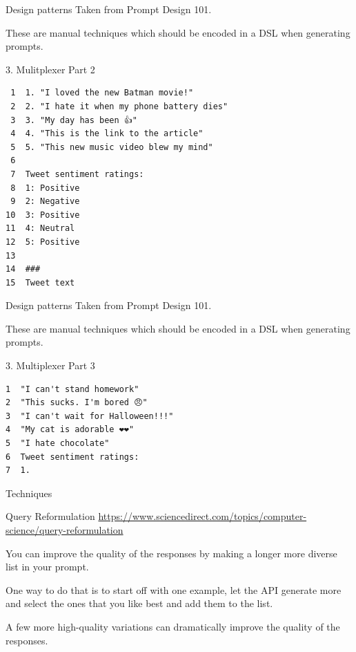 \documentclass[presentation]{beamer}
\begin{document}
\begin{frame}[label={sec:org9448e95},fragile]{Design patterns}
 Taken from Prompt Design 101.

These are manual techniques which should be
encoded in a DSL when generating prompts.

\begin{block}{3. Mulitplexer Part 2}
{\tiny
\begin{verbatim}
 1  1. "I loved the new Batman movie!"
 2  2. "I hate it when my phone battery dies"
 3  3. "My day has been 👍"
 4  4. "This is the link to the article"
 5  5. "This new music video blew my mind"
 6  
 7  Tweet sentiment ratings:
 8  1: Positive
 9  2: Negative
10  3: Positive
11  4: Neutral
12  5: Positive
13  
14  ###
15  Tweet text
\end{verbatim}
}
\end{block}
\end{frame}

\begin{frame}[label={sec:orgee4cfec},fragile]{Design patterns}
 Taken from Prompt Design 101.

These are manual techniques which should be
encoded in a DSL when generating prompts.

\begin{block}{3. Multiplexer Part 3}
{\footnotesize
\begin{verbatim}
1  "I can't stand homework"
2  "This sucks. I'm bored 😠"
3  "I can't wait for Halloween!!!"
4  "My cat is adorable ❤️❤️"
5  "I hate chocolate"
6  Tweet sentiment ratings:
7  1.
\end{verbatim}
}
\end{block}
\end{frame}

\begin{frame}[label={sec:orgcd024b0}]{Techniques}
\begin{block}{Query Reformulation}
\url{https://www.sciencedirect.com/topics/computer-science/query-reformulation}

You can improve the quality of the responses
by making a longer more diverse list in your
prompt.

One way to do that is to start off with one
example, let the API generate more and select
the ones that you like best and add them to
the list.

A few more high-quality variations can
dramatically improve the quality of the
responses.
\end{block}
\end{frame}
\end{document}
